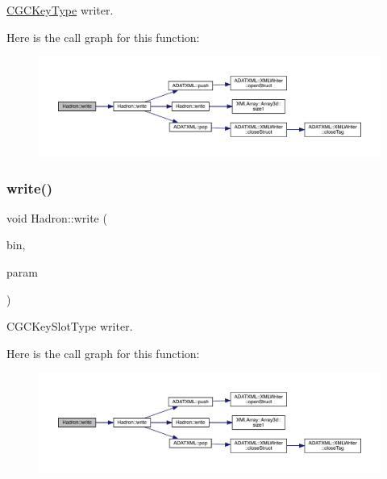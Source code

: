 \mbox{\hyperlink{structHadron_1_1CGCKeyType}{C\+G\+C\+Key\+Type}} writer. 

Here is the call graph for this function\+:
\nopagebreak
\begin{figure}[H]
\begin{center}
\leavevmode
\includegraphics[width=350pt]{d1/daf/namespaceHadron_a4073084eccc97c67b860f51e4efd91e0_cgraph}
\end{center}
\end{figure}
\mbox{\label{namespaceHadron_aeadf04c31606521c48ee674d28e2ca3e}} 
\subsubsection{\texorpdfstring{write()}{write()}\hspace{0.1cm}{\footnotesize\ttfamily [2/95]}}
{\footnotesize\ttfamily void Hadron\+::write (\begin{DoxyParamCaption}\item[{\mbox{\hyperlink{classADATIO_1_1BinaryWriter}{Binary\+Writer}} \&}]{bin,  }\item[{const \mbox{\hyperlink{structHadron_1_1KeyCGCSU2__t}{Key\+C\+G\+C\+S\+U2\+\_\+t}} \&}]{param }\end{DoxyParamCaption})}



C\+G\+C\+Key\+Slot\+Type writer. 

Here is the call graph for this function\+:
\nopagebreak
\begin{figure}[H]
\begin{center}
\leavevmode
\includegraphics[width=350pt]{d1/daf/namespaceHadron_aeadf04c31606521c48ee674d28e2ca3e_cgraph}
\end{center}
\end{figure}
\mbox{\label{namespaceHadron_a3ba652c4917e69b9056f2dd7621483df}} 
